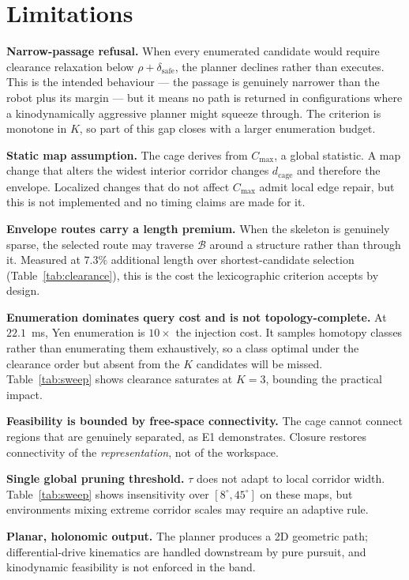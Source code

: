 \documentclass[conference]{IEEEtran}
\begin{document}
\section{Limitations}

\textbf{Narrow-passage refusal.} When every enumerated candidate would require clearance relaxation below $\rho+\delta_{\mathrm{safe}}$, the planner declines rather than executes. This is the intended behaviour --- the passage is genuinely narrower than the robot plus its margin --- but it means no path is returned in configurations where a kinodynamically aggressive planner might squeeze through. The criterion is monotone in $K$, so part of this gap closes with a larger enumeration budget.

\textbf{Static map assumption.} The cage derives from $C_{\max}$, a global statistic. A map change that alters the widest interior corridor changes $d_{\mathrm{cage}}$ and therefore the envelope. Localized changes that do not affect $C_{\max}$ admit local edge repair, but this is not implemented and no timing claims are made for it.

\textbf{Envelope routes carry a length premium.} When the skeleton is genuinely sparse, the selected route may traverse $\mathcal{B}$ around a structure rather than through it. Measured at $7.3\%$ additional length over shortest-candidate selection (Table~\ref{tab:clearance}), this is the cost the lexicographic criterion accepts by design.

\textbf{Enumeration dominates query cost and is not topology-complete.} At $22.1$~ms, Yen enumeration is $10\times$ the injection cost. It samples homotopy classes rather than enumerating them exhaustively, so a class optimal under the clearance order but absent from the $K$ candidates will be missed. Table~\ref{tab:sweep} shows clearance saturates at $K=3$, bounding the practical impact.

\textbf{Feasibility is bounded by free-space connectivity.} The cage cannot connect regions that are genuinely separated, as E1 demonstrates. Closure restores connectivity of the \emph{representation}, not of the workspace.

\textbf{Single global pruning threshold.} $\tau$ does not adapt to local corridor width. Table~\ref{tab:sweep} shows insensitivity over $[8^\circ,45^\circ]$ on these maps, but environments mixing extreme corridor scales may require an adaptive rule.

\textbf{Planar, holonomic output.} The planner produces a 2D geometric path; differential-drive kinematics are handled downstream by pure pursuit, and kinodynamic feasibility is not enforced in the band.
\end{document}
